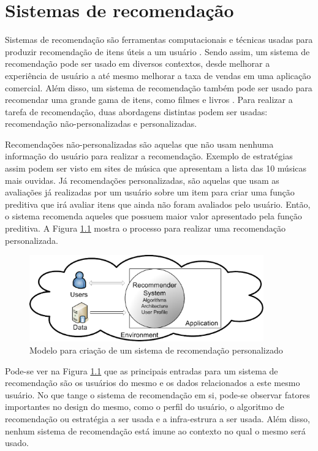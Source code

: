 \chapter[Sistemas de recomendação]{Sistemas de recomendação}

Sistemas de recomendação são ferramentas computacionais e técnicas usadas para
produzir recomendação de itens úteis a um usuário \cite{mahmood2009improving}.
Sendo assim, um sistema de recomendação pode ser usado em diversos contextos,
desde melhorar a experiência de usuário a até mesmo melhorar a taxa de vendas
em uma aplicação comercial. Além disso, um sistema de recomendação também pode
ser usado para recomendar uma grande gama de itens, como filmes e livros
\cite{ricci2011introduction}. Para realizar a tarefa de recomendação, duas abordagens distintas podem ser usadas:
recomendação não-personalizadas e personalizadas.

Recomendações não-personalizadas são aquelas que não usam nenhuma informação do
usuário para realizar a recomendação. Exemplo de estratégias assim podem ser
visto em sites de música que apresentam a lista das 10 músicas mais
ouvidas. Já recomendações personalizadas, são aquelas que usam as avaliações já
realizadas por um usuário sobre um item para criar uma função preditiva que irá avaliar itens que ainda não foram
avaliados pelo usuário. Então, o sistema recomenda aqueles que possuem maior valor
apresentado pela função preditiva. A Figura \ref{fig:modelo_recomendacao} mostra
o processo para realizar uma recomendação personalizada.

\begin{figure}[h]
  \centering
  \includegraphics[width=0.9\textwidth]{figuras/recommender_model.eps}
  \caption{Modelo para criação de um sistema de recomendação personalizado \cite{picault2011get}}
  \label{fig:modelo_recomendacao}
\end{figure}

Pode-se ver na Figura \ref{fig:modelo_recomendacao} que as principais entradas
para um sistema de recomendação são os usuários do mesmo e os dados relacionados
a este mesmo usuário. No que tange o sistema de recomendação em si, pode-se
observar fatores importantes no design do mesmo, como o perfil do usuário, o
algoritmo de recomendação ou estratégia a ser usada e a infra-estrura a ser
usada. Além disso, nenhum sistema de recomendação está imune ao contexto no qual
o mesmo será usado.

